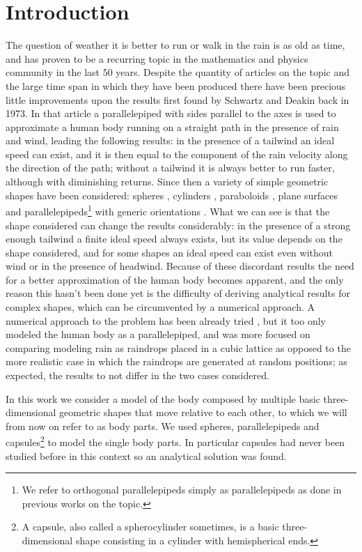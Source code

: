 \documentclass[a4paper,12pt]{article}
\begin{document}
\section{Introduction}
The question of weather it is better to run or walk in the rain is as old as time, and has proven to be a recurring topic in the mathematics and physics community in the last 50 years. Despite the quantity of articles on the topic and the large time span in which they have been produced there have been precious little improvements upon the results first found by Schwartz and Deakin \cite{Deakin} back in 1973. In that article a parallelepiped with sides parallel to the axes is used to approximate a human body running on a straight path in the presence of rain and wind, leading the following results: in the presence of a tailwind an ideal speed can exist, and it is then equal to the component of the rain velocity along the direction of the path; without a tailwind it is always better to run faster, although with diminishing returns. Since then a variety of simple geometric shapes have been considered: spheres \cite{Hailman}\cite{Bocci}, cylinders \cite{Bocci}, paraboloids \cite{Hailman}, plane surfaces \cite{Bocci} and parallelepipeds\footnote{We refer to orthogonal parallelepipeds simply as  parallelepipeds as done in previous works on the topic.} with generic orientations \cite{Bocci}. What we can see is that the shape considered can change the results considerably: in the presence of a strong enough tailwind a finite ideal speed always exists, but its value depends on the shape considered, and for some shapes an ideal speed can exist even without wind or in the presence of headwind. Because of these discordant results the need for a better approximation of the human body becomes apparent, and the only reason this hasn't been done yet is the difficulty of deriving analytical results for complex shapes, which can be circumvented by a numerical approach. A numerical approach to the problem has been already tried \cite{Kroetz}, but it too only modeled the human body as a parallelepiped, and was more focused on comparing modeling rain as raindrops placed in a cubic lattice as opposed to the more realistic case in which the raindrops are generated at random positions; as expected, the results to not differ in the two cases considered. 

In this work we consider a model of the body composed by multiple basic three-dimensional geometric shapes that move relative to each other, to which we will from now on refer to as body parts. We used  spheres, parallelepipeds and capsules\footnote{A capsule, also called a spherocylinder sometimes, is a basic three-dimensional shape consisting in a cylinder with hemispherical ends.} to model the single body parts. In particular capsules had never been studied before in this context so an analytical solution was found. 
\end{document}
